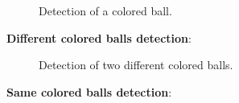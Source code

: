 \documentclass{sciposter}
\begin{document}
\begin{multicols}{3}
\begin{figure}[!h]
	\centering
			\setlength{\fboxsep}{1pt}
			\setlength{\fboxrule}{1pt}
	\caption{Detection of a colored ball.}
	\label{fig:single_color}
\end{figure}

\textbf{Different colored balls detection}:

\begin{figure}[!h]
	\centering
			\setlength{\fboxsep}{1pt}
			\setlength{\fboxrule}{1pt}
	\caption{Detection of two different colored balls.}
	\label{fig:diff_color}
\end{figure}

\textbf{Same colored balls detection}:


\end{multicols}
\end{document}
